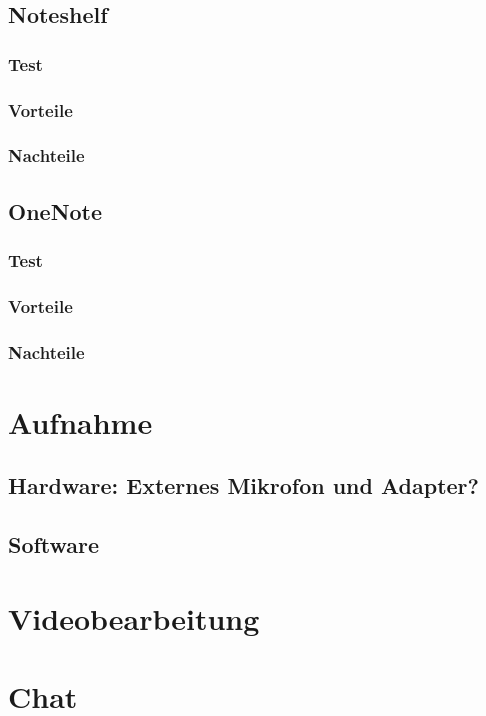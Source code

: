 \documentclass[parskip=off,index=totocnumbered]{scrreprt}
\begin{document}
\section{Noteshelf}
\subsection{Test}
\subsection{Vorteile}
\subsection{Nachteile}

\section{OneNote}
\subsection{Test}
\subsection{Vorteile}
\subsection{Nachteile}

\chapter{Aufnahme}
\section{Hardware: Externes Mikrofon und Adapter?}
\section{Software}

\chapter{Videobearbeitung}

\chapter{Chat}
\end{document}
